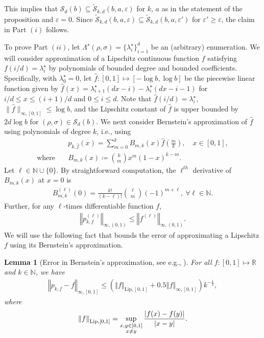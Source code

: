 \documentclass[a4paper,onecolumn,11pt,accepted=2026-05-12]{quantumarticle}
\newtheorem{lemma}[theorem]{Lemma}
\newcommand{\norm}[1]{\left\Vert#1\right\Vert}
\newcommand{\abs}[1]{\left\vert#1\right\vert}
\newcommand{\cS}{\mathcal{S}}
\newcommand{\NN}{\mathbb{N}}
\newcommand{\RR}{\mathbb{R}}
\begin{document}
This implies that $\cS_d(b) \subseteq 
 \tilde{\cS}_{k,d}(b,a,\varepsilon) $ for $k$, $a$ as in the statement of the proposition and $\varepsilon=0$. Since $\tilde{\cS}_{k,d}(b,a,\varepsilon) \subseteq \tilde{\cS}_{k,d}(b,a,\varepsilon') $ for $\varepsilon' \geq \varepsilon$,  the claim in Part $(i)$ follows.

 \medskip


 To prove  Part $(ii)$, let  $\Lambda^{\star}(\rho,\sigma)=\{\lambda_i^{\star}\}_{i=1}^d$ be an  (arbitrary) enumeration. We will consider approximation of a Lipschitz continuous function $f$ satisfying $f(i/d)=\lambda_i^{\star}$  by polynomials of bounded degree and bounded coefficients. Specifically, with $\lambda_0^{\star}=0$, let $\hat f\colon [0,1] \mapsto \left[-\log  b ,\log  b \right]$ be the piecewise linear function given by 
 $\hat f(x)=\lambda^{\star}_{i+1}(dx-i)-\lambda_i^{\star}(dx-i-1)$ for $i/d \leq x \leq (i+1)/d$ and $0 \leq i \leq d$. Note that $\hat f(i/d)=\lambda_i^{\star}$, $\big\|\hat f\big\|_{\infty,[0,1]} \leq \log  b $,  and the Lipschitz constant of $\hat f$ is upper bounded by $2d \log  b $ for $(\rho,\sigma) \in \cS_d(b)$. 
 We next consider Bernstein's approximation of $\hat f$ using  polynomials of degree $k$, i.e., using
 \begin{subequations}\label{eq:Bernsteinpolyapprox}
      \begin{align}
    & p_{k,\hat f}(x)= \sum_{m=0}^k B_{m,k}(x) \hat f\!\left(\frac{m}{k}\right), \quad x \in [0,1], \label{eq:bernsteinapprox}\\
     \mbox{where} \quad & 
     B_{m,k}(x)\coloneqq \binom{k}{m} x^m (1-x)^{k-m}. \label{eq:bernsteinmonom}
 \end{align}
 \end{subequations}
Let $\ell \in \NN \cup \{0\}$. By straightforward computation,   the $\ell^{th}$ derivative of $B_{m,k}(x)$ at $x=0$ is 
 \begin{align}
     B_{m,k}^{(\ell)}(0)=\frac{k !}{(k-\ell)!} \binom{\ell}{m} (-1)^{m+\ell}, ~\forall \ell \in \NN. \label{eq:derexpberstein} 
 \end{align}
 Further,  for any  $\ell$-times differentiable function $f$,
       \begin{align}
\norm{p_{k,f}^{(\ell)}}_{\infty,(0,1)} \leq \norm{f^{(\ell)}}_{\infty,(0,1)}. \label{eq:derbndbernstein}
 \end{align}
We will use the following fact that  bounds the  error of approximating a Lipschitz $f$ using its Bernstein's approximation. 
\begin{lemma}[Error in Bernstein's approximation, see e.g., \cite{Davis-1975}] \label{Lem:Bernstein-approxerr}
For all $f\colon [0,1] \mapsto \RR$ and $k \in \NN $, we have
\begin{align}
\norm{p_{k,f}-f}_{\infty,[0,1]} \leq \left( \norm{f}_{\mathrm{Lip},[0,1]}+0.5\norm{f}_{\infty,[0,1]}\right) k^{-\frac 13},\label{eq:approxbndbernstein}
\end{align}
where 
\begin{align}
    \norm{f}_{\mathrm{Lip},[0,1]}=\sup_{\substack{x,y \in [0,1] \\ x \neq y}} \frac{\abs{f(x)-f(y)}}{\abs{x-y}}. \notag
\end{align}
\end{lemma}
\end{document}
